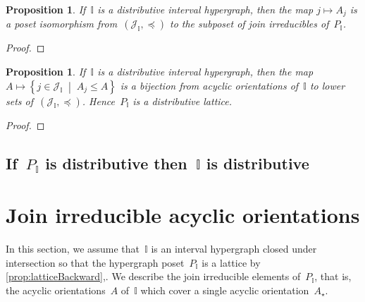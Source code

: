 \documentclass[reqno]{amsart}
\newtheorem{proposition}[theorem]{Proposition}
\theoremstyle{definition}
\newcommand{\cal}[1]{\mathcal{#1}} %
\newcommand{\set}[2]{\left\{ #1 \;\middle|\; #2 \right\}} %
\newcommand{\vincent}[1]{\todo[color=blue!30]{#1 \\ \hfill --- V.}}
\newcommand{\II}{\mathbb I} %
\newcommand{\cJ}{\cal{J}} %
\begin{document}
\begin{proposition}
\label{prop:distributiveForwardI}
If~$\II$ is a distributive interval hypergraph, then the map $j \mapsto A_j$ is a poset isomorphism from~$(\cJ_\II, \preccurlyeq)$ to the subposet of join irreducibles of~$P_\II$.
\end{proposition}

\begin{proof}
\vincent{todo}
\end{proof}

\begin{proposition}
If~$\II$ is a distributive interval hypergraph, then the map~$A \mapsto \set{j \in \cJ_\II}{A_j \le A}$ is a bijection from acyclic orientations of~$\II$ to lower sets of~$(\cJ_\II, \preccurlyeq)$. Hence~$P_\II$ is a distributive lattice.
\end{proposition}

\begin{proof}
\vincent{todo}
\end{proof}


\subsection{If~$P_\II$ is distributive then~$\II$ is distributive}
\label{subsec:distributiveLatticeForward}




\section{Join irreducible acyclic orientations}
\label{sec:joinIrreducibles}

In this section, we assume that~$\II$ is an interval hypergraph closed under intersection so that the hypergraph poset~$P_\II$ is a lattice  by \cref{prop:latticeBackward},.
We describe the join irreducible elements of~$P_\II$, that is, the acyclic orientations~$A$ of~$\II$ which cover a single acyclic orientation~$A_\star$.
\end{document}
